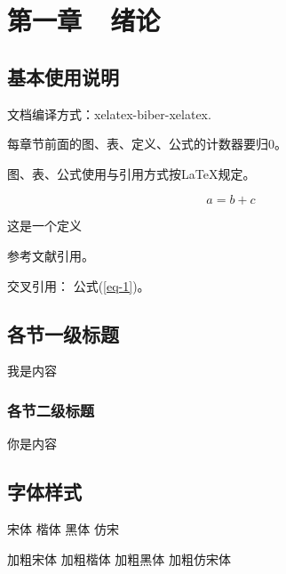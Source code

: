 \pagestyle{fancy}
\fancyhead{} %
\fancyfoot[C]{\thepage}%
\renewcommand{\headrulewidth}{1pt} %
\renewcommand{\footrulewidth}{0pt}

\section*{第一章~~绪论}
\setcounter{section}{1} \setcounter{subsection}{0} 
\setcounter{table}{0} \setcounter{figure}{0} \setcounter{equation}{0} \setcounter{definition}{0}

\subsection{基本使用说明}
文档编译方式：xelatex-biber-xelatex.

每章节前面的图、表、定义、公式的计数器要归0。

图、表、公式使用与引用方式按\LaTeX 规定。

\begin{equation}
    a=b+c \label{eq-1}
\end{equation}

\begin{definition}
    这是一个定义
\end{definition}

参考文献引用\cite{kai1979prospect}。

交叉引用： 公式(\ref{eq-1})。

\subsection{各节一级标题}
我是内容

\subsubsection{各节二级标题}
你是内容


\subsection{字体样式}

{\song 宋体 \kai 楷体 \hei 黑体 \fs 仿宋}

{\tbf 加粗宋体 \kaitib 加粗楷体 \heitib 加粗黑体 \fangsongti 加粗仿宋体}

\newpage